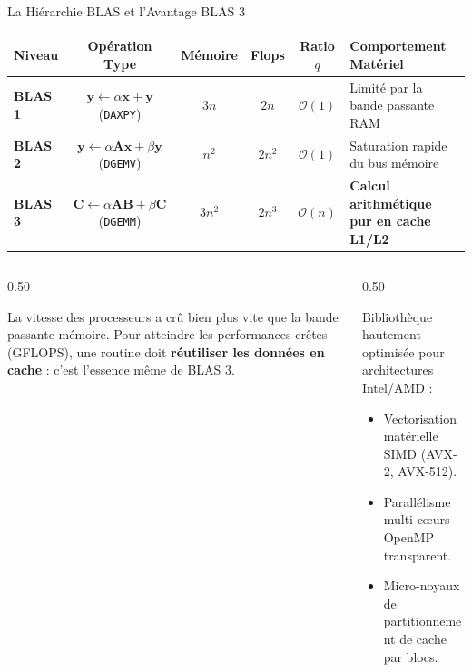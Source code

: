 \documentclass[aspectratio=169, 10pt, french]{beamer}
\begin{document}
\begin{frame}{La Hiérarchie BLAS et l'Avantage BLAS 3}
    \begin{center}
    \small
    \begin{tabularx}{\textwidth}{lccccX}
        \toprule
        \textbf{Niveau} & \textbf{Opération Type} & \textbf{Mémoire} & \textbf{Flops} & \textbf{Ratio $q$} & \textbf{Comportement Matériel} \\
        \midrule
        \textbf{BLAS 1} & $\mathbf{y} \leftarrow \alpha\mathbf{x} + \mathbf{y}$ (\texttt{DAXPY}) & $3n$ & $2n$ & $\mathcal{O}(1)$ & Limité par la bande passante RAM \\
        \textbf{BLAS 2} & $\mathbf{y} \leftarrow \alpha\mathbf{A}\mathbf{x} + \beta\mathbf{y}$ (\texttt{DGEMV}) & $n^2$ & $2n^2$ & $\mathcal{O}(1)$ & Saturation rapide du bus mémoire \\
        \textbf{BLAS 3} & $\mathbf{C} \leftarrow \alpha\mathbf{A}\mathbf{B} + \beta\mathbf{C}$ (\texttt{DGEMM}) & $3n^2$ & $2n^3$ & $\mathcal{O}(n)$ & \textbf{Calcul arithmétique pur en cache L1/L2} \\
        \bottomrule
    \end{tabularx}
    \end{center}

    \vspace{0.2cm}
    \begin{columns}[c]
        \begin{column}{0.50\textwidth}
            \begin{cadrehpc}
                \footnotesize
                La vitesse des processeurs a crû bien plus vite que la bande passante mémoire.
                Pour atteindre les performances crêtes (GFLOPS), une routine doit \textbf{réutiliser les données en cache} : c'est l'essence même de BLAS 3.
            \end{cadrehpc}
        \end{column}
        \begin{column}{0.50\textwidth}
            \begin{cadreconcept}
                \footnotesize
                Bibliothèque hautement optimisée pour architectures Intel/AMD :
                \begin{itemize}
                    \item Vectorisation matérielle SIMD (AVX-2, AVX-512).
                    \item Parallélisme multi-cœurs OpenMP transparent.
                    \item Micro-noyaux de partitionnement de cache par blocs.
                \end{itemize}
            \end{cadreconcept}
        \end{column}
    \end{columns}
\end{frame}
\end{document}
